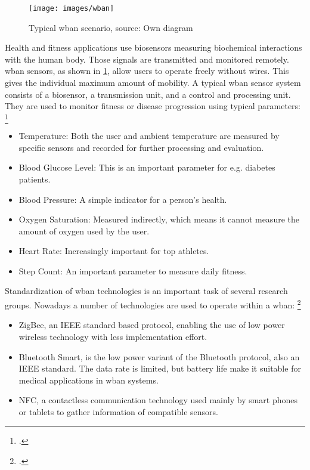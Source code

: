 \begin{figure}[ht]
  \centering
  \texttt{[image: images/wban]}
  \caption{Typical \gls{wban} scenario, source: Own diagram}
  \label{fig:wban}
\end{figure}

Health and fitness applications use biosensors measuring biochemical interactions with the human body. Those signals are transmitted and monitored remotely. \gls{wban} sensors, as shown in \cref{fig:wban}, allow users to operate freely without wires. This gives the individual maximum amount of mobility. A typical \gls{wban} sensor system consists of a biosensor, a transmission unit, and a control and processing unit. They are used to monitor fitness or disease progression using typical parameters: \footcite[Cf.][69--70]{Minoli2013}

\begin{itemize}
  \item Temperature: Both the user and ambient temperature are measured by specific sensors and recorded for further processing and evaluation.
  \item Blood Glucose Level: This is an important parameter for e.g. diabetes patients.
  \item Blood Pressure: A simple indicator for a person's health.
  \item Oxygen Saturation: Measured indirectly, which means it cannot measure the amount of oxygen used by the user.
  \item Heart Rate: Increasingly important for top athletes.
  \item Step Count: An important parameter to measure daily fitness.
\end{itemize}

Standardization of \gls{wban} technologies is an important task of several research groups. Nowadays a number of technologies are used to operate within a \gls{wban}: \footcite[Cf.][71]{Minoli2013}

\begin{itemize}
  \item ZigBee, an IEEE standard based protocol, enabling the use of low power wireless technology with less implementation effort.
  \item Bluetooth Smart, is the low power variant of the Bluetooth protocol, also an IEEE standard. The data rate is limited, but battery life make it suitable for medical applications in \gls{wban} systems.
  \item NFC, a contactless communication technology used mainly by smart phones or tablets to gather information of compatible sensors.
\end{itemize}


